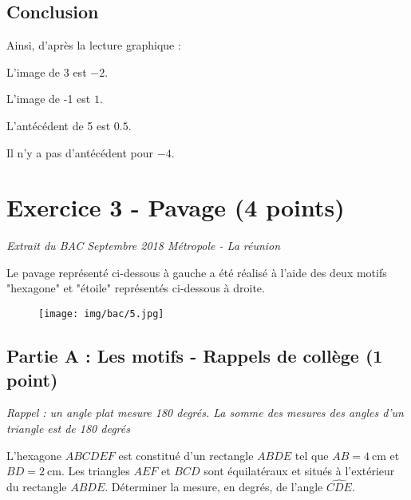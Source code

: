 \documentclass[answers]{exam}
\begin{document}
\begin{solution}
\subsection*{Conclusion}

Ainsi, d'après la lecture graphique :
\begin{compactitem}
\item L'image de 3 est \(-2\).
\item L'image de -1 est \(1\).
\item L'antécédent de 5 est \(0.5\).
\item Il n'y a pas d'antécédent pour \(-4\).
\end{compactitem}
\end{solution}

\section*{Exercice 3 - Pavage (4 points)}

\textit{Extrait du BAC Septembre 2018 Métropole - La réunion}

\vspace{1em}

Le pavage représenté ci-dessous à gauche a été réalisé à l’aide des deux motifs "hexagone" et "étoile" représentés ci-dessous à droite.

\begin{figure}[H]
  \centering
  \texttt{[image: img/bac/5.jpg]}
\end{figure}

\subsection*{Partie A : Les motifs - Rappels de collège (1 point)}

\textit{Rappel : un angle plat mesure 180 degrés. La somme des mesures des angles d'un triangle est de 180 degrés}

\begin{questions}
  \question[1] L'hexagone $ABCDEF$ est constitué d’un rectangle $ABDE$ tel que $AB=\SI{4}{\centi\metre}$ et $BD=\SI{2}{\centi\metre}$.
  Les triangles $AEF$ et $BCD$ sont équilatéraux et situés à l’extérieur du rectangle $ABDE$. Déterminer la mesure, en degrés, de l’angle $\widehat{CDE}$.
\end{questions}
\end{document}
